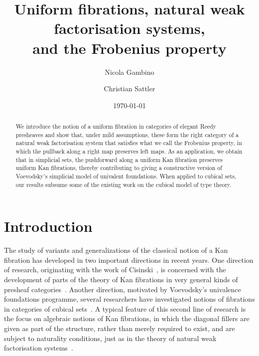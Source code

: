 \documentclass[reqno,10pt,a4paper,oneside]{amsart}
\title[Uniform fibrations]{Uniform fibrations, natural weak factorisation systems, \\ and
the Frobenius property}
\begin{document}
\begin{abstract}
We introduce the notion of a uniform fibration in categories of elegant Reedy presheaves
and show that, under mild assumptions, these form the right category of a natural weak
factorisation system that satisfies what we call the Frobenius property, \ie in which the
pullback along a right map preserves left maps. As an application, we obtain that in
simplicial sets,  the pushforward along a uniform Kan
fibration preserves uniform Kan fibrations, thereby contributing to giving a constructive
version of Voevodsky's simplicial model of univalent foundations. When applied
to cubical sets, our results  subsume some of the existing work on the cubical
model of type theory.
\end{abstract}

\author{Nicola Gambino}
\address{School of Mathematics, University of Leeds, Leeds LS2 9JT, UK}

\author{Christian Sattler}
\address{School of Mathematics, University of Leeds, Leeds LS2 9JT, UK}

\date{\today}

\maketitle



\section*{Introduction}

The study of variants and generalizations of the classical notion of a Kan fibration has developed
in two important directions in recent years. One direction of research, originating with the work of
Cisinski~\cite{cisinski-asterisque}, is concerned with the development of  parts of the theory of Kan fibrations in
very general kinds of presheaf categories~\cite{bergner-rezk-elegant,cisinski-univalence}.  Another direction, motivated by Voevodsky's univalence foundations programme, several researchers have investigated notions of fibrations in categories of cubical sets~\cite{awodey-cubical,coquand-cubical-sets,coquand-variation,huber-thesis,pitts-cubical-nominal,swan-awfs}. A typical feature of this second line of research is  the focus on algebraic notions of
Kan fibrations, in which the diagonal fillers are given as part of the structure, rather than merely required to
exist, and are subject to naturality conditions, just as 
in the theory of natural weak factorisation 
systems~\cite{grandis-tholen-nwfs}.
\end{document}
